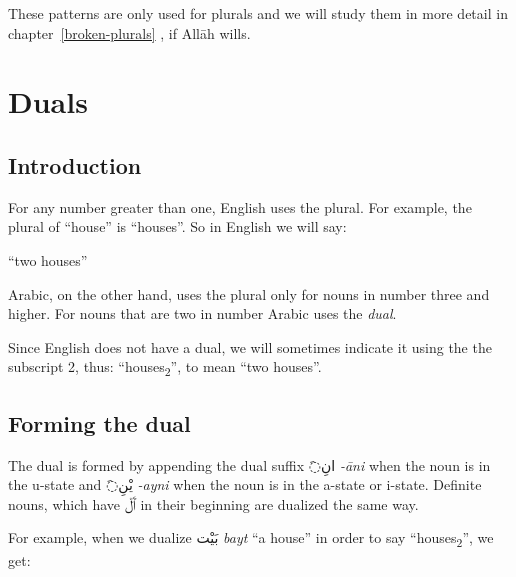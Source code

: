 \documentclass[
  10pt,
]{book}
\begin{document}
These patterns are only used for plurals and we will study them in more detail in chapter~\ref{broken-plurals}
, if Allāh wills.

\chapter{Duals}\label{duals}

\section{Introduction}\label{introduction-7}

For any number greater than one, English uses the plural. For example, the plural of \enquote{house} is \enquote{houses}. So in English we will say:

\enquote{two houses}

Arabic, on the other hand, uses the plural only for nouns in number three and higher. For nouns that are two in number Arabic uses the \emph{dual}.

Since English does not have a dual, we will sometimes indicate it using the the subscript 2, thus: \enquote{houses\textsubscript{2}}, to mean \enquote{two houses}.

\section{Forming the dual}\label{forming-the-dual}

The dual is formed by appending the dual suffix \foreignlanguage{arabic}{◌َانِ} \emph{-āni} when the noun is in the u-state and \foreignlanguage{arabic}{◌َيْنِ} \emph{-ayni} when the noun is in the a-state or i-state. Definite nouns, which have \foreignlanguage{arabic}{ٱَلْ} in their beginning are dualized the same way.

For example, when we dualize \foreignlanguage{arabic}{بَيْت} \emph{bayt} \enquote{a house} in order to say \enquote{houses\textsubscript{2}}, we get:
\end{document}
